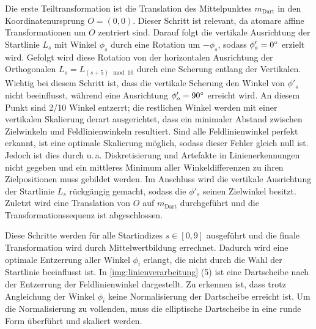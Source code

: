 Die erste Teiltransformation ist die Translation des Mittelpunktes $m_\text{Dart}$ in den Koordinatenursprung $O =(0, 0)$. Dieser Schritt ist relevant, da atomare affine Transformationen um $O$ zentriert sind. Darauf folgt die vertikale Ausrichtung der Startlinie $L_s$ mit Winkel $\phi_s$ durch eine Rotation um $-\phi_s$, sodass $\phi'_s = 0^{\circ}$ erzielt wird. Gefolgt wird diese Rotation von der horizontalen Ausrichtung der Orthogonalen $L_o = L_{(s+5) \mod 10}$ durch eine Scherung entlang der Vertikalen. Wichtig bei diesem Schritt ist, dass die vertikale Scherung den Winkel von $\phi'_s$ nicht beeinflusst, während eine Ausrichtung $\phi'_o = 90^{\circ}$ erreicht wird. An diesem Punkt sind 2/10 Winkel entzerrt; die restlichen Winkel werden mit einer vertikalen Skalierung derart ausgerichtet, dass ein minimaler Abstand zwischen Zielwinkeln und Feldlinienwinkeln resultiert. Sind alle Feldlinienwinkel perfekt erkannt, ist eine optimale Skalierung möglich, sodass dieser Fehler gleich null ist. Jedoch ist dies durch u.\,a. Diskretisierung und Artefakte in Linienerkennungen nicht gegeben und ein mittleres Minimum aller Winkeldifferenzen zu ihren Zielpositionen muss gebildet werden. Im Anschluss wird die vertikale Ausrichtung der Startlinie $L_s$ rückgängig gemacht, sodass die $\phi'_s$ seinen Zielwinkel besitzt. Zuletzt wird eine Translation von $O$ auf $m_\text{Dart}$ durchgeführt und die Transformationssequenz ist abgeschlossen.

Diese Schritte werden für alle Startindizes $s \in [0, 9]$ ausgeführt und die finale Transformation wird durch Mittelwertbildung errechnet. Dadurch wird eine optimale Entzerrung aller Winkel $\phi_i$ erlangt, die nicht durch die Wahl der Startlinie beeinflusst ist. In \autoref{img:linienverarbeitung} (5) ist eine Dartscheibe nach der Entzerrung der Feldlinienwinkel dargestellt. Zu erkennen ist, dass trotz Angleichung der Winkel $\phi_i$ keine Normalisierung der Dartscheibe erreicht ist. Um die Normalisierung zu vollenden, muss die elliptische Dartscheibe in eine runde Form überführt und skaliert werden.


